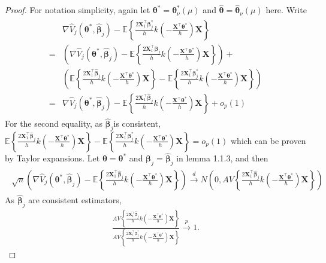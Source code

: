 \documentclass[12pt]{article}
\newcommand{\wh}{\widehat}
\newcommand{\itl}{\intercal}
\newcommand{\bs}{ \boldsymbol}
\newcommand{\lt}{\left}
\newcommand{\rt}{\right}
\begin{document}
\begin{proof} For notation simplicity, again let $\bs{\theta}^* = \bs{\theta}^*_{\nu}(\mu)$ and $\wh{\bs{\theta}} = \wh{\bs{\theta}}_{\nu}(\mu)$ here.
	Write
	\begin{gather*}
	\begin{flalign*}
	& \nabla\wh{V}_j\lt(\bs{\theta}^* , \wh{\bs{\beta}}_j\rt) - \mathbb{E}\lt\{\frac{2\bs{X}_{1}^{\intercal}\bs{\beta}^*_j}{h}k\lt(-\frac{\bs{X}^{\intercal}\bs{\theta}^*}{h}\rt)\bs{X}\rt\} \\
	=  & \lt( \nabla\wh{V}_j\lt(\bs{\theta}^* , \wh{\bs{\beta}}_j\rt) - \mathbb{E}\lt\{\frac{2\bs{X}_{1}^{\intercal}\wh{\bs{\beta}}_j}{h}k\lt(-\frac{\bs{X}^{\intercal}\bs{\theta}^*}{h}\rt)\bs{X}\rt\} \rt) + \\ & \lt( \mathbb{E}\lt\{\frac{2\bs{X}_{1}^{\intercal}\wh{\bs{\beta}}_j}{h}k\lt(-\frac{\bs{X}^{\intercal}\bs{\theta}^*}{h}\rt)\bs{X}\rt\} - \mathbb{E}\lt\{\frac{2\bs{X}_{1}^{\intercal}\bs{\beta}^*_j}{h}k\lt(-\frac{\bs{X}^{\intercal}\bs{\theta}^*}{h}\rt)\bs{X}\rt\} \rt) \\
	=  & \nabla\wh{V}_j\lt(\bs{\theta}^* , \wh{\bs{\beta}}_j\rt) - \mathbb{E}\lt\{\frac{2\bs{X}_{1}^{\intercal}\wh{\bs{\beta}}_j}{h}k\lt(-\frac{\bs{X}^{\intercal}\bs{\theta}^*}{h}\rt)\bs{X}\rt\}  + o_p(1)
	\end{flalign*}
	\end{gather*}
	For the second equality, as $\wh{\bs{\beta}}_j$is consistent, $\mathbb{E}\lt\{\frac{2\bs{X}_{1}^{\intercal}\wh{\bs{\beta}}_j}{h}k\lt(-\frac{\bs{X}^{\intercal}\bs{\theta}^*}{h}\rt)\bs{X}\rt\} - \mathbb{E}\lt\{\frac{2\bs{X}_{1}^{\intercal}\bs{\beta}^*_j}{h}k\lt(-\frac{\bs{X}^{\intercal}\bs{\theta}^*}{h}\rt)\bs{X}\rt\} = o_p(1)$ which can be proven by Taylor expansions. Let $\bs{\theta} = \bs{\theta}^*$ and $\bs{\beta}_{j} = \wh{\bs{\beta}}_{j}$ in lemma 1.1.3, and then
	\begin{gather}
	\begin{flalign*}
	\sqrt{n}\lt(\nabla\wh{V}_j\lt(\bs{\theta}^* , \wh{\bs{\beta}}_j\rt) - \mathbb{E}\lt\{\frac{2\bs{X}_{1}^{\intercal}\wh{\bs{\beta}}_j}{h}k\lt(-\frac{\bs{X}^{\intercal}\bs{\theta}^*}{h}\rt)\bs{X}\rt\}\rt)\overset{d}{\to}N\lt(0,AV\lt\{\frac{2\bs{X}_1^{\itl}\wh{\bs{\beta}}_j}{h}k\lt(-\frac{\bs{X}^{\itl}\bs{\theta}^*}{h}\rt)\bs{X}\rt\}\rt)
	\end{flalign*}
	\end{gather}
	As $\widehat{\bs{\beta}}_{j}$ are consistent estimators,
	\begin{gather*}
	\frac{AV\lt\{\frac{2\bs{X}_1^{\itl}\widehat{\bs{\beta}}_{j}}{h}k\lt(-\frac{\bs{X}^{\itl}\bs{\theta}^*}{h}\rt)\bs{X}\rt\}}{AV\lt\{\frac{2\bs{X}_1^{\itl}\bs{\beta}^*_{j}}{h}k\lt(-\frac{\bs{X}^{\itl}\bs{\theta}^*}{h}\rt)\bs{X}\rt\}} \overset{p}{\to} 1.

\end{gather*}
\end{proof}
\end{document}
